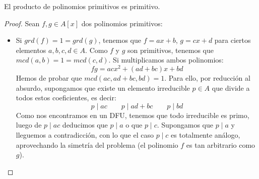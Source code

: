 \begin{lema}[de Gauss]
    \label{lemaGauss}
    El producto de polinomios primitivos es primitivo.
\begin{proof}
    Sean $f,g\in A[x]$ dos polinomios primitivos:
    \begin{itemize}
        \item Si $grd(f) = 1 = grd(g)$, tenemos que $f=ax +b$, $g = cx+d$ para ciertos elementos $a,b,c,d\in A$. Como $f$ y $g$ son primitivos, tenemos que $mcd(a,b) = 1 = mcd(c,d)$. Si multiplicamos ambos polinomios:
            \begin{equation*}
                fg = acx^2 + (ad + bc)x + bd
            \end{equation*}
            Hemos de probar que $mcd(ac, ad + bc, bd) = 1$. Para ello, por reducción al absurdo, supongamos que existe un elemento irreducible $p\in A$ que divide a todos estos coeficientes, es decir:
            \begin{equation*}
                p\mid ac \qquad p\mid ad + bc \qquad p \mid bd
            \end{equation*}
            Como nos encontramos en un DFU, tenemos que todo irreducible es primo, luego de $p\mid ac$ deducimos que $p\mid a$ o que $p \mid c$. Supongamos que $p \mid a$ y lleguemos a contradicción, con lo que el caso $p \mid c$ es totalmente análogo, aprovechando la simetría del problema (el polinomio $f$ es tan arbitrario como $g$).


\end{itemize}
\end{proof}
\end{lema}
